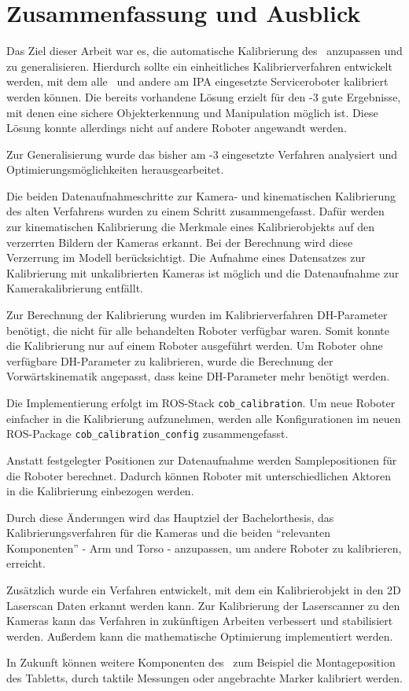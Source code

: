 \chapter{Zusammenfassung und Ausblick}

Das Ziel dieser Arbeit war es, die automatische Kalibrierung des \cob\ anzupassen 
und zu generalisieren. Hierdurch sollte ein einheitliches Kalibrierverfahren 
entwickelt werden, mit dem alle \cob\ und andere am \ac{IPA} eingesetzte 
Serviceroboter kalibriert werden können. Die bereits vorhandene Lösung erzielt für
den -3 gute Ergebnisse, mit denen eine sichere Objekterkennung und
Manipulation möglich ist.
Diese Lösung konnte allerdings nicht auf andere Roboter angewandt werden.

Zur Generalisierung wurde das bisher am -3 eingesetzte Verfahren analysiert
und Optimierungsmöglichkeiten herausgearbeitet.

Die beiden Datenaufnahmeschritte zur Kamera- und kinematischen Kalibrierung  
des alten Verfahrens wurden zu einem Schritt zusammengefasst.
Dafür werden zur 
kinematischen Kalibrierung die Merkmale eines Kalibrierobjekts auf den
verzerrten Bildern der Kameras erkannt. Bei der Berechnung wird diese
Verzerrung im Modell berücksichtigt. Die Aufnahme eines Datensatzes zur
Kalibrierung mit unkalibrierten
Kameras ist möglich und die Datenaufnahme zur Kamerakalibrierung entfällt. 

Zur Berechnung der Kalibrierung wurden im Kalibrierverfahren \ac{DH-Parameter}
benötigt, die nicht für alle behandelten Roboter verfügbar waren. Somit 
konnte die Kalibrierung nur auf einem Roboter ausgeführt werden.
Um Roboter ohne verfügbare \ac{DH-Parameter} zu kalibrieren, wurde die Berechnung
der Vorwärtskinematik angepasst, dass keine \ac{DH-Parameter} mehr benötigt
werden.


Die Implementierung erfolgt im \ac{ROS}-Stack \texttt{cob\_calibration}.
Um neue Roboter einfacher in die Kalibrierung aufzunehmen, werden alle
Konfigurationen im neuen \ac{ROS}-Package \texttt{cob\_calibration\_config}
zusammengefasst.

Anstatt festgelegter Positionen zur Datenaufnahme werden Samplepositionen für
die Roboter berechnet.  
Dadurch können Roboter mit unterschiedlichen Aktoren in die Kalibrierung einbezogen 
werden.


Durch diese Änderungen wird das Hauptziel der Bachelorthesis, das
Kalibrierungsverfahren für die Kameras und die beiden "`relevanten 
Komponenten"'\cite{Haug2012} - Arm und Torso - anzupassen, um andere Roboter
zu kalibrieren, erreicht.

Zusätzlich wurde ein Verfahren entwickelt, mit dem ein Kalibrierobjekt in den 
2D Laserscan Daten erkannt werden kann. Zur Kalibrierung der Laserscanner zu 
den Kameras kann das Verfahren in zukünftigen Arbeiten verbessert und stabilisiert
werden. Außerdem kann die mathematische Optimierung implementiert werden.

In Zukunft können weitere Komponenten des \cob\, zum Beispiel die Montageposition 
des Tabletts, durch taktile Messungen oder angebrachte Marker kalibriert werden.

